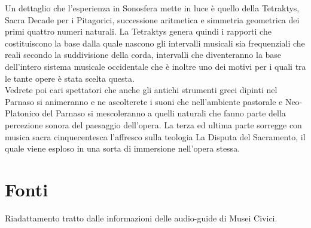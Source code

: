 \documentclass[hidelinks,12pt,a4paper]{article}
\begin{document}
\begin{flushleft}
			Un dettaglio che l'esperienza in Sonosfera mette in luce è quello della Tetraktys, Sacra Decade per i Pitagorici, successione aritmetica e simmetria geometrica dei primi quattro numeri naturali. La Tetraktys genera quindi i rapporti che costituiscono la base dalla quale nascono gli intervalli musicali sia frequenziali che reali secondo la suddivisione della corda, intervalli che diventeranno la base dell'intero sistema musicale occidentale che è inoltre uno dei motivi per i quali tra le tante opere è stata scelta questa.\\
			Vedrete poi cari spettatori che anche gli antichi strumenti greci dipinti nel Parnaso si animeranno e ne ascolterete i suoni che nell'ambiente pastorale e Neo-Platonico del Parnaso si mescoleranno a quelli naturali che fanno parte della percezione sonora del paesaggio dell'opera. La terza ed ultima parte sorregge con musica sacra cinquecentesca l'affresco sulla teologia La Disputa del Sacramento, il quale viene esploso in una sorta di immersione nell'opera stessa.
			
			\section{Fonti}
			Riadattamento tratto dalle informazioni delle audio-guide di Musei Civici.
	
			\vspace*{\fill}
			\doclicenseThis
		\end{flushleft}
\end{document}
